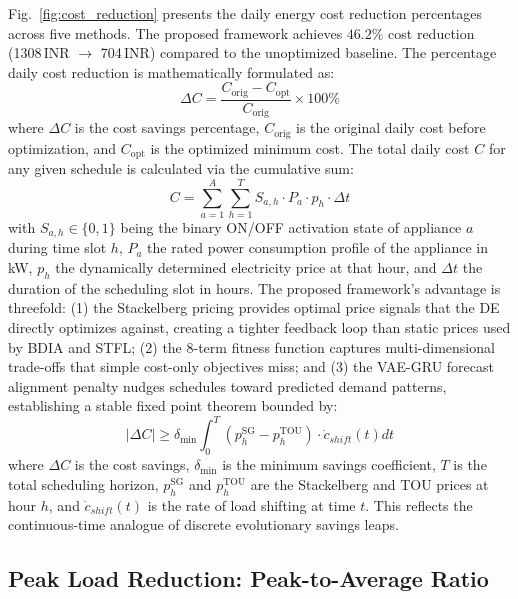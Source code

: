 \documentclass[journal]{IEEEtran}
\begin{document}
Fig.~\ref{fig:cost_reduction} presents the daily energy cost reduction percentages across five methods. The proposed framework achieves $46.2\%$ cost reduction (1308\,INR $\to$ 704\,INR) compared to the unoptimized baseline. The percentage daily cost reduction is mathematically formulated as:
\begin{equation}
    \Delta C = \frac{C_{\text{orig}} - C_{\text{opt}}}{C_{\text{orig}}} \times 100\%
\end{equation}
where $\Delta C$ is the cost savings percentage, $C_{\text{orig}}$ is the original daily cost before optimization, and $C_{\text{opt}}$ is the optimized minimum cost. The total daily cost $C$ for any given schedule is calculated via the cumulative sum:
\begin{equation}
    C = \sum_{a=1}^{A}\sum_{h=1}^{T} S_{a,h} \cdot P_a \cdot p_h \cdot \Delta t
\end{equation}
with $S_{a,h} \in \{0, 1\}$ being the binary ON/OFF activation state of appliance $a$ during time slot $h$, $P_a$ the rated power consumption profile of the appliance in kW, $p_h$ the dynamically determined electricity price at that hour, and $\Delta t$ the duration of the scheduling slot in hours. The proposed framework's advantage is threefold: (1) the Stackelberg pricing provides optimal price signals that the DE directly optimizes against, creating a tighter feedback loop than static prices used by BDIA and STFL; (2) the 8-term fitness function captures multi-dimensional trade-offs that simple cost-only objectives miss; and (3) the VAE-GRU forecast alignment penalty nudges schedules toward predicted demand patterns, establishing a stable fixed point theorem bounded by:
\begin{equation}
    \left| \Delta C \right| \geq \delta_{\text{min}} \int_{0}^{T} (p_h^{\text{SG}} - p_h^{\text{TOU}}) \cdot \dot{c}_{shift}(t) dt
\end{equation}
where $\Delta C$ is the cost savings, $\delta_{\text{min}}$ is the minimum savings coefficient, $T$ is the total scheduling horizon, $p_h^{\text{SG}}$ and $p_h^{\text{TOU}}$ are the Stackelberg and TOU prices at hour $h$, and $\dot{c}_{shift}(t)$ is the rate of load shifting at time $t$. This reflects the continuous-time analogue of discrete evolutionary savings leaps.

\subsection{Peak Load Reduction: Peak-to-Average Ratio}
\end{document}
